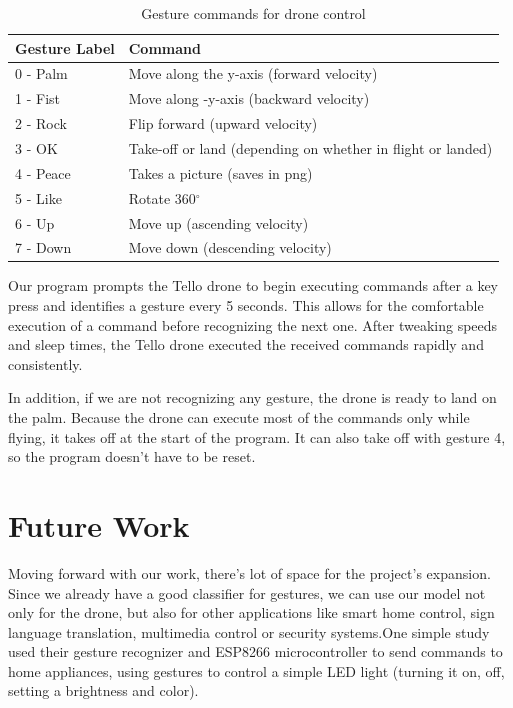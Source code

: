 \begin{table}[ht]
	\centering
	\begin{tabular}{ll}
		\toprule
		Gesture Label & Command \\
		\midrule
		0 - Palm& Move along the y-axis (forward velocity) \\
		1 - Fist& Move along -y-axis (backward velocity) \\
		2 - Rock& Flip forward (upward velocity) \\
		3 - OK & Take-off or land (depending on whether in flight or landed) \\
		4 - Peace& Takes a picture (saves in png) \\
		5 - Like& Rotate 360$^\circ$ \\
		6 - Up& Move up (ascending velocity) \\
		7 - Down & Move down (descending velocity)\\
		\bottomrule
	\end{tabular}
	\caption{Gesture commands for drone control}
	\label{tab:gesture_commands}
\end{table}

Our program prompts the Tello drone to begin executing commands after a key press and identifies a gesture every 5 seconds. This allows for the comfortable execution of a command before recognizing the next one. After tweaking speeds and sleep times, the Tello drone executed the received commands rapidly and consistently.

In addition, if we are not recognizing any gesture, the drone is ready to land on the palm. Because the drone can execute most of the commands only while flying, it takes off at the start of the program. It can also take off with gesture 4, so the program doesn't have to be reset.


\section{Future Work}
Moving forward with our work, there's lot of space for the project's expansion. Since we already have a good classifier for gestures, we can use our model not only for the drone, but also for other applications like smart home control, sign language translation, multimedia control or security systems.\newline One simple study \cite{doi:10.1080/08839514.2023.2176607} used their gesture recognizer and ESP8266 microcontroller to send commands to home appliances, using gestures to control a simple LED light (turning  it on, off, setting a brightness and color).

